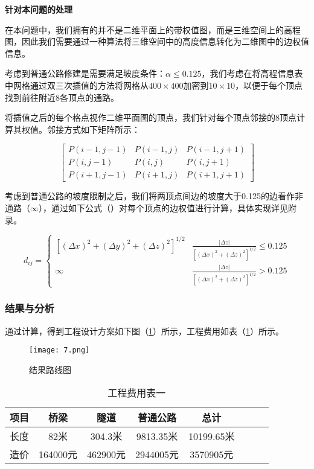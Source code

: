 \documentclass[bwprint]{cumcmthesis}
\begin{document}
\textbf{针对本问题的处理}

在本问题中，我们拥有的并不是二维平面上的带权值图，而是三维空间上的高程图，因此我们需要通过一种算法将三维空间中的高度信息转化为二维图中的边权值信息。

考虑到普通公路修建是需要满足坡度条件：$\alpha \leqslant 0.125$，我们考虑在将高程信息表中网格通过双三次插值的方法将网格从$400\times 400$加密到$10\times 10$，以便于每个顶点找到前往附近8各顶点的通路。

将插值之后的每个格点视作二维平面图的顶点，我们针对每个顶点邻接的8顶点计算其权值。邻接方式如下矩阵所示：

$$\left[
\begin{matrix}
P(i-1,j-1)&P(i-1,j)&P(i-1,j+1)\\
P(i,j-1)&P(i,j)&P(i,j+1)\\
P(i+1,j-1)&P(i+1,j)&P(i+1,j+1)
\end{matrix}
\right]
$$

考虑到普通公路的坡度限制之后，我们将两顶点间边的坡度大于0.125的边看作非通路（$\infty$），通过如下公式（）对每个顶点的边权值进行计算，具体实现详见附录。

\begin{equation}
d_{ij}=\left\{
\begin{array}{lr} 
[(\Delta x)^2+(\Delta y)^2+(\Delta z)^2]^{1/2} & \frac{|\Delta z|}{[(\Delta x)^2+(\Delta z)^2]^{1/2}} \leqslant 0.125\\
\infty & \frac{|\Delta z|}{[(\Delta x)^2+(\Delta z)^2]^{1/2}} >0.125
\end{array}
\right.
\end{equation}

\subsubsection{结果与分析}

通过计算，得到工程设计方案如下图（\ref{结果路线图}）所示，工程费用如表（\ref{工程费用表一}）所示。

\begin{figure}[h]
\small
\centering
\texttt{[image: 7.png]}
\caption{结果路线图} 
\label{结果路线图}
\end{figure}

\begin{table}[h]
\centering
\caption{工程费用表一}
\label{工程费用表一}
\begin{tabular}{|c|c|c|c|c|c|c|c|}
\hline
 项目 & 桥梁 & 隧道 & 普通公路 & 总计\\ \hline
长度    & 82米   & 304.3米  & 9813.35米 & 10199.65米 \\ \hline
造价    & 164000元 & 462900元 & 2944005元 &3570905元\\
\hline
\end{tabular}
\end{table}
\end{document}
